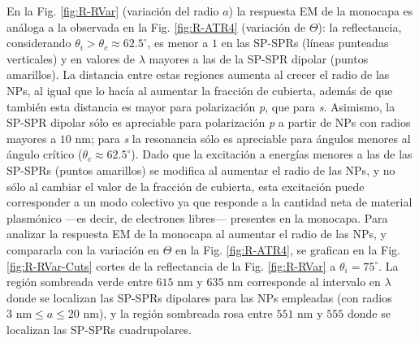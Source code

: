 En la Fig.   \ref{fig:R-RVar} (variación del radio $a$) la respuesta EM de la monocapa es análoga a la observada en la Fig. \ref{fig:R-ATR4} (variación de $\Theta$): la reflectancia, considerando $\theta_i>\theta_c\approx 62.5^\circ$, es menor a $1$ en las SP-SPRs (líneas punteadas verticales) y en valores de $\lambda$ mayores a las de la SP-SPR dipolar (puntos amarillos). La distancia entre estas regiones aumenta al crecer el radio de las NPs, al igual que lo hacía al aumentar la fracción de cubierta, además de que también esta distancia es mayor para polarización \emph{p}, que para \emph{s}. Asimismo, la SP-SPR dipolar sólo es apreciable para polarización \emph{p} a partir de NPs con radios mayores a $10$ nm; para \emph{s} la resonancia sólo es apreciable para ángulos menores al ángulo crítico ($\theta_c\approx 62.5^\circ$). Dado que la excitación a energías menores a las de las SP-SPRs (puntos amarillos) se modifica al aumentar el radio de las NPs, y no sólo al cambiar el valor de la fracción de cubierta, esta excitación puede corresponder a un modo colectivo ya que responde a la cantidad neta de material plasmónico ---es decir, de electrones libres--- presentes en la monocapa. Para analizar la respuesta EM de la monocapa al aumentar el radio de las NPs, y compararla con la variación en $\Theta$ en la Fig. \ref{fig:R-ATR4},  se grafican en la Fig. \ref{fig:R-RVar-Cuts}  cortes de la reflectancia de la Fig. \ref{fig:R-RVar} a $\theta_i = 75^\circ$. La región sombreada verde entre $615$ nm y $635$ nm corresponde al intervalo en $\lambda$ donde se localizan las SP-SPRs dipolares para las NPs empleadas (con radios $3\mbox{ nm}\leq a \leq 20\mbox{ nm}$), y la región sombreada rosa entre $551$ nm y $555$ donde se localizan las SP-SPRs cuadrupolares.

